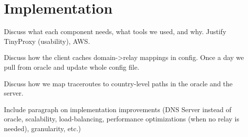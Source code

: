 \section{Implementation}
\label{implementation}

Discuss what each component needs, what tools we used, and why.  Justify TinyProxy (usability), AWS.

Discuss how the client caches domain->relay mappings in config.  Once a day we pull from oracle and update whole config file.

Discuss how we map traceroutes to country-level paths in the oracle and the server.

Include paragraph on implementation improvements (DNS Server instead of oracle, scalability, load-balancing, performance optimizations (when no relay is needed), granularity, etc.)

